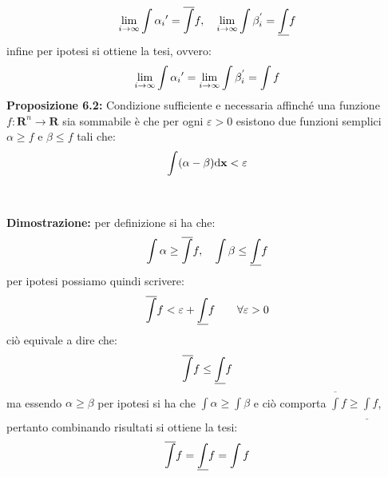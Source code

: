 \documentclass{article}
\begin{document}
\begin{gather}
    \lim_{i \rightarrow \infty} \int \alpha_i{'} = \overline{\int} f, \quad
    \lim_{i \rightarrow \infty} \int \beta_{i}^{'} = \underline{\int} f \notag
\end{gather}
infine per ipotesi si ottiene la tesi, ovvero:
\begin{gather}
    \lim_{i \rightarrow \infty} \int \alpha_i{'} = \lim_{i \rightarrow \infty} \int \beta_{i}^{'} = \int f \notag
\end{gather}
\textbf{Proposizione 6.2:} Condizione sufficiente e necessaria affinché una funzione \\ $f : \mathbf{R}^n \longrightarrow \mathbf{R}$ sia sommabile è che per ogni $\varepsilon > 0$ esistono due funzioni semplici $\alpha \geq f$ e $\beta \leq f$ tali che:
\begin{gather}
    \int (\alpha - \beta) \mathrm{d} \mathbf{x} < \varepsilon \notag
\end{gather} \\ \\
\textbf{Dimostrazione:} per definizione si ha che:
\begin{gather}
    \int \alpha \geq \overline{\int} f, \quad \int \beta \leq \underline{\int} f \notag
\end{gather}
per ipotesi possiamo quindi scrivere:
\begin{gather}
    \overline{\int} f < \varepsilon + \underline{\int} f \qquad \forall \varepsilon > 0 \notag
\end{gather}
ciò equivale a dire che:
\begin{gather}
    \overline{\int} f \leq \underline{\int} f \notag
\end{gather}
ma essendo $\alpha \geq \beta$ per ipotesi si ha che $\int \alpha \geq \int \beta$ e ciò comporta $\overline{\int} f \geq \underline{\int} f$, pertanto combinando risultati si ottiene la tesi:
\begin{gather}
    \overline{\int} f = \underline{\int} f = \int f \notag
\end{gather}
\end{document}
